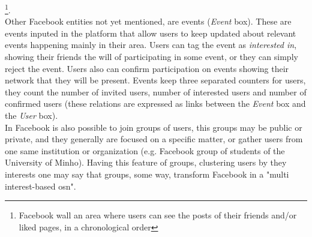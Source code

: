 \footnote{Facebook wall an area where users can see the posts of their friends and/or liked pages, in a chronological order}.\\
\indent Other Facebook entities not yet mentioned, are events (\textit{Event} box). These are events inputed in the platform that allow
users to keep updated about relevant events happening mainly in their area. Users can tag the event as \textit{interested in}, showing their friends
the will of participating in some event, or they can simply reject the event. Users also can confirm participation on events
showing their network that they will be present. Events keep three separated counters for users, they count the number of invited users, number of
interested users and number of confirmed users (these relations are expressed as links between the \textit{Event} box and the \textit{User} box).\\
\indent In Facebook is also possible to join groups of users, this groups may be public or private, and they generally are focused on a specific matter,
or gather users from one same institution or organization (e.g. Facebook group of students of the University of Minho).
Having this feature of groups, clustering users by they interests one may say that groups, some way, transform Facebook in a "multi interest-based \gls{osn}".

